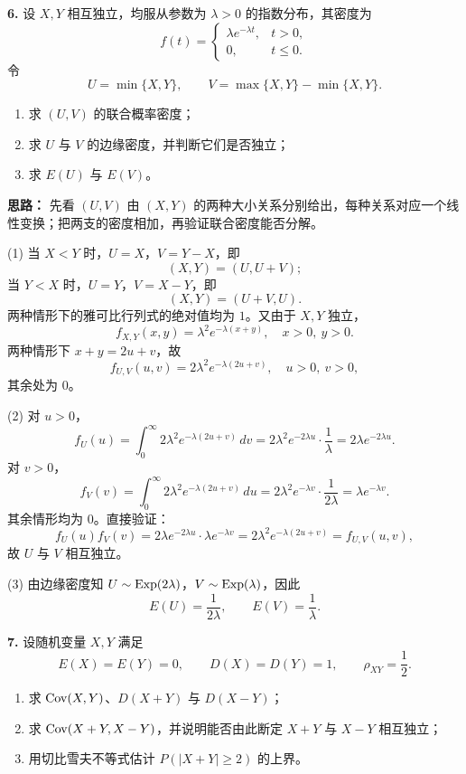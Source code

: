 \else \answerarea[10] \fi%

\textbf{6.} 设 $X,Y$ 相互独立，均服从参数为 $\lambda>0$ 的指数分布，其密度为
\[
f(t)=\begin{cases}
\lambda e^{-\lambda t}, & t>0,\\
0, & t\leq0.
\end{cases}
\]
令
\[
U=\min\{X,Y\},\qquad V=\max\{X,Y\}-\min\{X,Y\}.
\]
\begin{enumerate}
    \item[(1)] 求 $(U,V)$ 的联合概率密度；
    \item[(2)] 求 $U$ 与 $V$ 的边缘密度，并判断它们是否独立；
    \item[(3)] 求 $E(U)$ 与 $E(V)$。
\end{enumerate}

\ifshowsolutions%
\textbf{思路：} 先看 $(U,V)$ 由 $(X,Y)$ 的两种大小关系分别给出，每种关系对应一个线性变换；把两支的密度相加，再验证联合密度能否分解。

(1) 当 $X<Y$ 时，$U=X$，$V=Y-X$，即
\[
(X,Y)=(U,U+V);
\]
当 $Y<X$ 时，$U=Y$，$V=X-Y$，即
\[
(X,Y)=(U+V,U).
\]
两种情形下的雅可比行列式的绝对值均为 $1$。又由于 $X,Y$ 独立，
\[
f_{X,Y}(x,y)=\lambda^2e^{-\lambda(x+y)},\quad x>0,\ y>0.
\]
两种情形下 $x+y=2u+v$，故
\[
f_{U,V}(u,v)=2\lambda^2e^{-\lambda(2u+v)},\quad u>0,\ v>0,
\]
其余处为 $0$。

(2) 对 $u>0$，
\[
f_U(u)=\int_0^\infty2\lambda^2e^{-\lambda(2u+v)}\,dv
=2\lambda^2e^{-2\lambda u}\cdot\frac1\lambda
=2\lambda e^{-2\lambda u}.
\]
对 $v>0$，
\[
f_V(v)=\int_0^\infty2\lambda^2e^{-\lambda(2u+v)}\,du
=2\lambda^2e^{-\lambda v}\cdot\frac1{2\lambda}
=\lambda e^{-\lambda v}.
\]
其余情形均为 $0$。直接验证：
\[
f_U(u)f_V(v)=2\lambda e^{-2\lambda u}\cdot\lambda e^{-\lambda v}
=2\lambda^2e^{-\lambda(2u+v)}=f_{U,V}(u,v),
\]
故 $U$ 与 $V$ 相互独立。

(3) 由边缘密度知 $U\sim\operatorname{Exp}(2\lambda)$，$V\sim\operatorname{Exp}(\lambda)$，因此
\[
E(U)=\frac1{2\lambda},\qquad E(V)=\frac1\lambda.
\]

\else \answerarea[10] \fi%

\textbf{7.} 设随机变量 $X,Y$ 满足
\[
E(X)=E(Y)=0,\qquad D(X)=D(Y)=1,\qquad \rho_{XY}=\frac12.
\]
\begin{enumerate}
    \item[(1)] 求 $\operatorname{Cov}(X,Y)$、$D(X+Y)$ 与 $D(X-Y)$；
    \item[(2)] 求 $\operatorname{Cov}(X+Y,X-Y)$，并说明能否由此断定 $X+Y$ 与 $X-Y$ 相互独立；
    \item[(3)] 用切比雪夫不等式估计 $P(|X+Y|\geq2)$ 的上界。
\end{enumerate}

